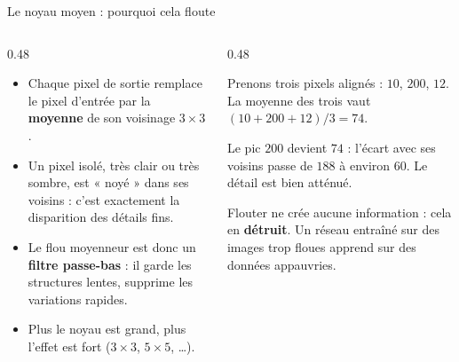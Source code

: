 \begin{frame}{Le noyau moyen : pourquoi cela floute}
\begin{columns}[t]
\begin{column}{0.48\textwidth}
\begin{itemize}
  \item Chaque pixel de sortie remplace le pixel d'entrée par la
  \textbf{moyenne} de son voisinage $3 \times 3$.
  \item Un pixel isolé, très clair ou très sombre, est « noyé » dans ses
  voisins : c'est exactement la disparition des détails fins.
  \item Le flou moyenneur est donc un \textbf{filtre passe-bas} :
  il garde les structures lentes, supprime les variations rapides.
  \item Plus le noyau est grand, plus l'effet est fort
  ($3\times3$, $5\times5$, \dots).
\end{itemize}
\end{column}
\begin{column}{0.48\textwidth}
\begin{ebox}
Prenons trois pixels alignés : $10$, $200$, $12$.
La moyenne des trois vaut $(10 + 200 + 12)/3 = 74$.

\medskip
Le pic $200$ devient $74$ : l'écart avec ses voisins passe de $188$ à
environ $60$. Le détail est bien atténué.
\end{ebox}
\begin{wbox}[Le revers]
Flouter ne crée aucune information : cela en \textbf{détruit}. Un réseau
entraîné sur des images trop floues apprend sur des données appauvries.
\end{wbox}
\end{column}
\end{columns}
\end{frame}

